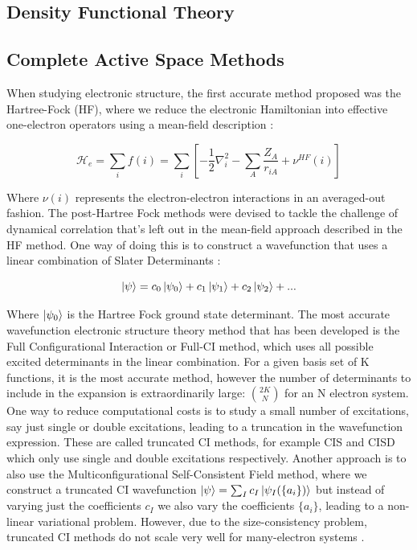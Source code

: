 \subsection{Density Functional Theory}


\subsection {Complete Active Space Methods}

When studying electronic structure, the first accurate method proposed was the Hartree-Fock (HF), where we reduce the electronic Hamiltonian into effective one-electron operators using a mean-field description :

\begin{equation}
    \mathcal{H}_e = \sum_{i} f(i) = \sum_{i}[ -\frac{1}{2} \nabla_i^2 - \sum_A \frac{Z_A}{r_{iA}} + \nu^{HF}(i)]
\end{equation}

Where $\nu(i)$ represents the electron-electron interactions in an averaged-out fashion. The post-Hartree Fock methods were devised to tackle the challenge of dynamical correlation that's left out in the mean-field approach described in the HF method. One way of doing this is to construct a wavefunction that uses a linear combination of Slater Determinants : 

\begin{equation}
\ket{\psi} = c_0 \ket{\psi_0} + c_1 \ket{\psi_1} + c_2 \ket{\psi_2} + ...
\end{equation}

Where $\ket{\psi_0}$ is the Hartree Fock ground state determinant. The most accurate wavefunction electronic structure theory method that has been developed is the Full Configurational Interaction or Full-CI method, which uses all possible excited determinants in the linear combination. For a given basis set of K functions, it is the most accurate method, however the number of determinants to include in the expansion is extraordinarily large: $2K \choose N$ for an N electron system. One way to reduce computational costs is to study a small number of excitations, say just single or double excitations, leading to a truncation in the wavefunction expression. These are called truncated CI methods, for example CIS and CISD which only use single and double excitations respectively. Another approach is to also use the Multiconfigurational Self-Consistent Field method, where we construct a truncated CI wavefunction $\ket{\psi} = \sum_I c_I \ket{\psi_I (\{a_i\})}$ but instead of varying just the coefficients $c_I$ we also vary the coefficients $\{a_i\}$, leading to a non-linear variational problem. However, due to the size-consistency problem, truncated CI methods do not scale very well for many-electron systems \cite{szabo2012modern}.


